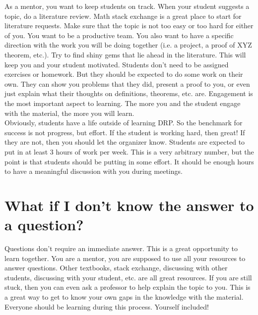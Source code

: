 \documentclass{article}
\begin{document}
As a mentor, you want to keep students on track. When your student suggests a topic, do a literature
review. Math stack exchange is a great place to start for literature requests. Make sure that the topic is not too easy or too hard for either of you. You want to be a
productive team. You also want to have a specific direction with the work you will be doing together
(i.e. a project, a proof of XYZ theorem, etc.). Try to find shiny gems that lie ahead in the
literature. This will keep you and your student motivated. Students don't need to be assigned
exercises or homework. But they should be expected to do some work on their own. They can show you
problems that they did, present a proof to you, or even just explain what their thoughts on
definitions, theorems, etc. are. Engagement is the most important aspect to learning. The more you
and the student engage with the material, the more you will learn. \\ Obviously, students have a
life outside of learning DRP. So the benchmark for success is not progress, but effort. If the
student is working hard, then great! If they are not, then you should let the organizer know.
Students are expected to put in at least 3 hours of work per week. This is a very arbitrary number,
but the point is that students should be putting in some effort. It should be enough hours to 
have a meaningful discussion with you during meetings. 

\section{What if I don't know the answer to a question?}

Questions don't require an immediate answer. 
This is a great opportunity to learn together. You are a mentor, you are supposed to use all your
resources to answer questions. Other textbooks, stack exchange, discussing with other students,
discussing with your student, etc. are all great resources. If you are still stuck, then you can
even ask a professor to help explain the topic to you. This is a great way to get to know your own
gaps in the knowledge with the material. Everyone should be learning during this process. Yourself
included! 

 
\end{document}
